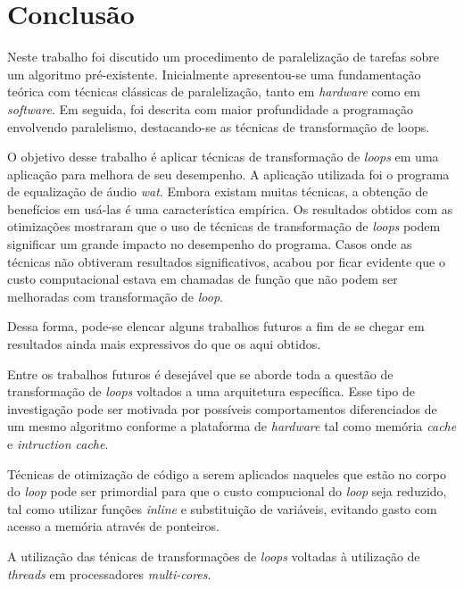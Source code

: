 \chapter{Conclusão}

Neste trabalho foi discutido um procedimento de paralelização de tarefas sobre 
um algoritmo pré-existente. 
Inicialmente apresentou-se uma fundamentação teórica com técnicas clássicas de 
paralelização, tanto em \textit{hardware} como em \textit{software}. 
Em seguida, foi descrita com maior profundidade a programação envolvendo 
paralelismo, destacando-se as técnicas de transformação de loops.

O objetivo desse trabalho é aplicar técnicas de transformação de \textit{loops} 
em uma aplicação para melhora de seu desempenho. 
A aplicação utilizada foi o programa de equalização de áudio \textit{wat}. 
Embora existam muitas técnicas, a obtenção de benefícios em usá-las é uma 
característica empírica. 
Os resultados obtidos com as otimizações mostraram que o uso de técnicas de
transformação de \textit{loops} podem significar um grande impacto no desempenho
do programa.
Casos onde as técnicas não obtiveram resultados significativos, acabou por ficar
evidente que o custo computacional estava em chamadas de função que não podem
ser melhoradas com transformação de \textit{loop}.

Dessa forma, pode-se elencar alguns trabalhos futuros a fim de se chegar em 
resultados ainda mais expressivos do que os aqui obtidos. 

Entre os trabalhos futuros é desejável que se aborde toda a questão de 
transformação de \textit{loops} voltados a uma arquitetura específica. 
Esse tipo de investigação pode ser motivada por possíveis comportamentos 
diferenciados de um mesmo algoritmo conforme a plataforma de 
\textit{hardware} tal como memória \textit{cache} e \textit{intruction cache}.

Técnicas de otimização de código a serem aplicados naqueles que estão no
corpo do \textit{loop} pode ser primordial para que o custo compucional do
\textit{loop} seja reduzido, tal como utilizar funções \textit{inline} e
substituição de variáveis, evitando gasto com acesso a memória através de
ponteiros.

A utilização das ténicas de transformações de \textit{loops} voltadas à
utilização de \textit{threads} em processadores \textit{multi-cores}.
